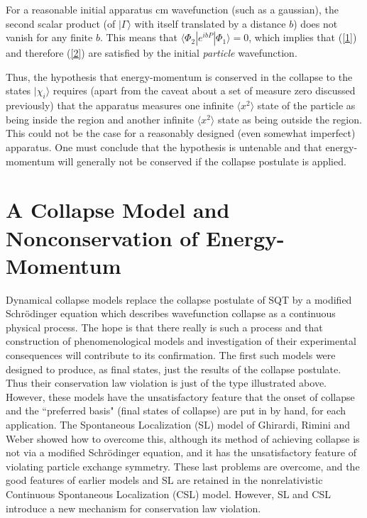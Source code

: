 \documentclass[12pt]{article}
\begin{document}
\noindent For a reasonable initial apparatus cm wavefunction (such as a gaussian), the second scalar product  
(of $|\Gamma\rangle$ with itself translated by a distance $b$) does not vanish for any finite $b$.  This 
means that $\langle\Phi_{2}| e^{ibP}|\Phi_{1}\rangle = 0$, which implies that (\ref{1}) and therefore 
(\ref{2}) are satisfied by the initial {\it particle} wavefunction. 

	Thus, the hypothesis that energy-momentum is conserved in 
the collapse to the states $|\chi_{i}\rangle$ requires (apart from the caveat about a set of measure zero 
discussed previously) that the apparatus 
measures one infinite $\langle x^{2}\rangle$ state of the particle as being inside the 
region and another infinite $\langle x^{2}\rangle$ state as being outside the region. This could not 
be the case for a reasonably designed (even somewhat imperfect) apparatus. 
One must conclude that the hypothesis is untenable and 
that energy-momentum will generally not be conserved if the collapse postulate is applied. 


\section{A Collapse Model and Nonconservation of Energy-Momentum}\label{Intro}


\hspace{\parindent}Dynamical collapse models replace the collapse postulate of SQT by a modified 
Schr\"odinger equation which describes wavefunction collapse as a 
continuous physical process. The hope is that there really is such a process  
and that construction of phenomenological models and 
investigation of their experimental consequences will contribute 
to its confirmation. The first such models \cite{BohmBub,Pearle76-86} were 
designed to produce, as final states, just the results of the collapse postulate.  
Thus their conservation law violation is just of the type illustrated above.  
However, these models have the unsatisfactory feature that the onset of collapse 
and the ``preferred basis" (final states of collapse) are put in 
by hand, for each application\cite{PearlePerugia, Pearle89}. 
The Spontaneous Localization 
(SL) model\cite{GRW,GRReview} of Ghirardi, Rimini and Weber 
showed how to overcome this, although its 
method of achieving collapse is not via a modified Schr\"odinger equation, 
and it has the unsatisfactory feature of violating particle 
exchange symmetry. These last problems are overcome, and the good features of 
earlier models and SL are retained in the nonrelativistic 
Continuous Spontaneous Localization (CSL) 
model\cite{Pearle89,GPR,GPReview,PearleNaples}.  However, SL and CSL introduce 
a new mechanism for conservation law violation.  
\end{document}

